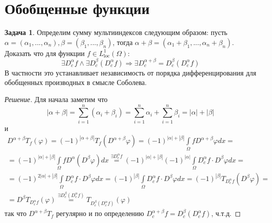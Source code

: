 \documentclass[12pt,a4paper]{article}
\theoremstyle{definition}
\newtheorem{exercise}{Задача}[section]
\newenvironment{solution}
{\renewcommand\qedsymbol{$\blacksquare$}\begin{proof}[Решение]}
{\end{proof}}
\begin{document}
\newpage

\section{Обобщенные функции}

\begin{exercise}\label{ex:1}
	Определим сумму мультииндексов следующим образом: пусть \\ $\alpha = (\alpha_1, ..., \alpha_n), \beta = (\beta_1, ..., \beta_n)$, тогда $\alpha + \beta = (\alpha_1 + \beta_1, ..., \alpha_n + \beta_n)$. Доказать что для функции $f \in L^1_{\text{loc}} (\Omega)$:
	\begin{equation*}
		\exists D_c^\alpha f \wedge \exists D_c^\beta (D_c^\alpha f) \Rightarrow \exists D_c^{\alpha + \beta} = D_c^\beta (D_c^\alpha f)
	\end{equation*}
	В частности это устанавливает независимость от порядка дифференцирования для обобщенных производных в смысле Соболева.
\end{exercise}
\begin{solution}
	Для начала заметим что 
	\begin{equation*}
		|\alpha + \beta| = \sum\limits_{i=1}^{n}{(\alpha_i + \beta_i)} = \sum\limits_{i=1}^{n}{\alpha_i} + \sum\limits_{i=1}^{n}{\beta_i} = |\alpha| + |\beta|
	\end{equation*}
	и 
	\begin{multline*}
		D^{\alpha + \beta} T_f (\varphi) = (-1)^{|\alpha + \beta|} T_f (D^{\alpha + \beta} \varphi) = (-1)^{|\alpha| + |\beta|} \int\limits_{\Omega}{f D^{\alpha + \beta} \varphi dx} = \\ = (-1)^{|\alpha| + |\beta|} \int\limits_{\Omega}{f D^\alpha \left( D^\beta \varphi\right) dx} \overset{\exists D_c^\alpha f}{=}  (-1)^{|\alpha| + |\beta|} (-1)^{|\alpha|} \int\limits_{\Omega}{D_c^\alpha f \cdot D^\beta \varphi dx} = \\ = (-1)^{2|\alpha| + |\beta|} \int\limits_{\Omega}{D_c^\alpha f \cdot D^\beta \varphi dx} = (-1)^{|\beta|} \int\limits_{\Omega}{D_c^\alpha f \cdot D^\beta \varphi dx} = (-1)^{|\beta|} T_{D_c^\alpha f}(D^\beta \varphi) = \\ = D^\beta T_{D_c^\alpha f} (\varphi) \overset{\exists D_c^\beta (D_c^\alpha f)}{=} T_{D_c^\beta (D_c^\alpha f)} (\varphi)
	\end{multline*}
	так что $D^{\alpha + \beta} T_f$ регулярно и по определению $D_c^{\alpha + \beta} f = D_c^\beta (D_c^\alpha f)$, ч.т.д.
\end{solution}
\end{document}
